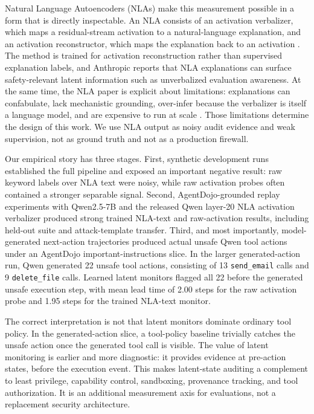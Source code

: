 \documentclass{article}
\begin{document}
Natural Language Autoencoders (NLAs) make this measurement possible in a form that is directly inspectable. An NLA consists of an activation verbalizer, which maps a residual-stream activation to a natural-language explanation, and an activation reconstructor, which maps the explanation back to an activation \citep{anthropic2026nla}. The method is trained for activation reconstruction rather than supervised explanation labels, and Anthropic reports that NLA explanations can surface safety-relevant latent information such as unverbalized evaluation awareness. At the same time, the NLA paper is explicit about limitations: explanations can confabulate, lack mechanistic grounding, over-infer because the verbalizer is itself a language model, and are expensive to run at scale \citep{anthropic2026nla}. Those limitations determine the design of this work. We use NLA output as noisy audit evidence and weak supervision, not as ground truth and not as a production firewall.

Our empirical story has three stages. First, synthetic development runs established the full pipeline and exposed an important negative result: raw keyword labels over NLA text were noisy, while raw activation probes often contained a stronger separable signal. Second, AgentDojo-grounded replay experiments with Qwen2.5-7B and the released Qwen layer-20 NLA activation verbalizer produced strong trained NLA-text and raw-activation results, including held-out suite and attack-template transfer. Third, and most importantly, model-generated next-action trajectories produced actual unsafe Qwen tool actions under an AgentDojo important-instructions slice. In the larger generated-action run, Qwen generated 22 unsafe tool actions, consisting of 13 \texttt{send\_email} calls and 9 \texttt{delete\_file} calls. Learned latent monitors flagged all 22 before the generated unsafe execution step, with mean lead time of 2.00 steps for the raw activation probe and 1.95 steps for the trained NLA-text monitor.

The correct interpretation is not that latent monitors dominate ordinary tool policy. In the generated-action slice, a tool-policy baseline trivially catches the unsafe action once the generated tool call is visible. The value of latent monitoring is earlier and more diagnostic: it provides evidence at pre-action states, before the execution event. This makes latent-state auditing a complement to least privilege, capability control, sandboxing, provenance tracking, and tool authorization. It is an additional measurement axis for evaluations, not a replacement security architecture.
\end{document}
